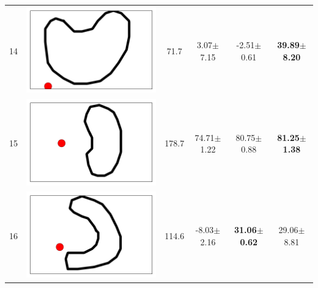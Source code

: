 \begin{table}[t]
{\begin{tabular}{llcccc}
14 &   \includegraphics[height= \shapesize cm]{tps-experiments/shapes/pts_3.png} &        71.7 &            3.07$\pm$7.15 &           -2.51$\pm$0.61 &  \textbf{39.89$\pm$8.20} \\
15 &   \includegraphics[height= \shapesize cm]{tps-experiments/shapes/pts_2.png} &       178.7 &           74.71$\pm$1.22 &           80.75$\pm$0.88 &  \textbf{81.25$\pm$1.38} \\
16 &   \includegraphics[height= \shapesize cm]{tps-experiments/shapes/pts_4.png} &       114.6 &           -8.03$\pm$2.16 &  \textbf{31.06$\pm$0.62} &           29.06$\pm$8.81 \\

\end{tabular}}
\end{table}
